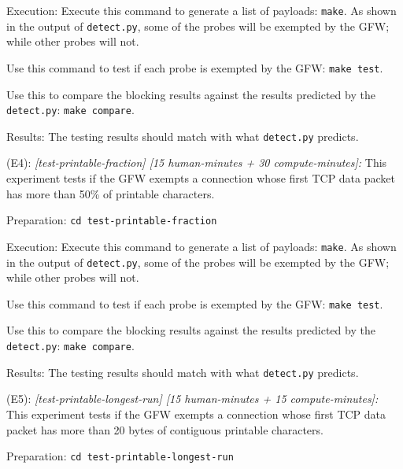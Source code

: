 \begin{compactdesc}
\begin{asparadesc}
        \item[Execution:]
        Execute this command to generate a list of payloads: \texttt{make}. 
        As shown in the output of \texttt{detect.py},
        some of the probes will be exempted by the GFW; 
        while other probes will not.

        Use this command to test if each probe is exempted by the GFW:
        \texttt{make test}.

        Use this to compare the blocking results against the results predicted by the \texttt{detect.py}:
        \texttt{make compare}.

        \item[Results:] The testing results should match with what \texttt{detect.py} predicts.
    \end{asparadesc}
    
    \item[(E4):] \textit{[test-printable-fraction] [15 human-minutes + 30 compute-minutes]:}
    This experiment tests if the GFW exempts a connection whose
    first TCP data packet has more than 50\% of printable characters.
    \begin{asparadesc}
        \item[Preparation:] \texttt{cd test-printable-fraction}

        \item[Execution:]
        Execute this command to generate a list of payloads: \texttt{make}. 
        As shown in the output of \texttt{detect.py},
        some of the probes will be exempted by the GFW; 
        while other probes will not.

        Use this command to test if each probe is exempted by the GFW:
        \texttt{make test}.

        Use this to compare the blocking results against the results predicted by the \texttt{detect.py}:
        \texttt{make compare}.

        \item[Results:] The testing results should match with what \texttt{detect.py} predicts.
    \end{asparadesc}
    
    \item[(E5):] \textit{[test-printable-longest-run] [15 human-minutes + 15 compute-minutes]:}
    This experiment tests if the GFW exempts a connection whose
    first TCP data packet has more than 20 bytes of contiguous printable characters.
    \begin{asparadesc}
        \item[Preparation:] \texttt{cd test-printable-longest-run}


\end{asparadesc}
\end{compactdesc}
